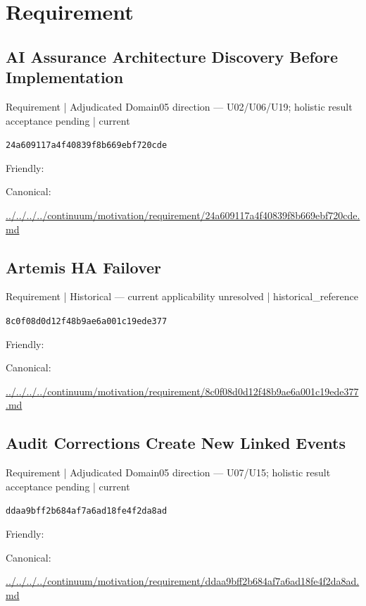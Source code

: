 \documentclass[10pt,a4paper]{article}
\begin{document}
\section*{Requirement}
\subsection*{AI Assurance Architecture Discovery Before Implementation}
{\small Requirement | Adjudicated Domain05 direction — U02/U06/U19; holistic result acceptance pending | current}\par
\texttt{24a609117a4f40839f8b669ebf720cde}\par
Friendly: \par
Canonical: \par
{\footnotesize\url{../../../../continuum/motivation/requirement/24a609117a4f40839f8b669ebf720cde.md}}\par
\subsection*{Artemis HA Failover}
{\small Requirement | Historical — current applicability unresolved | historical\_reference}\par
\texttt{8c0f08d0d12f48b9ae6a001c19ede377}\par
Friendly: \par
Canonical: \par
{\footnotesize\url{../../../../continuum/motivation/requirement/8c0f08d0d12f48b9ae6a001c19ede377.md}}\par
\subsection*{Audit Corrections Create New Linked Events}
{\small Requirement | Adjudicated Domain05 direction — U07/U15; holistic result acceptance pending | current}\par
\texttt{ddaa9bff2b684af7a6ad18fe4f2da8ad}\par
Friendly: \par
Canonical: \par
{\footnotesize\url{../../../../continuum/motivation/requirement/ddaa9bff2b684af7a6ad18fe4f2da8ad.md}}\par
\end{document}
